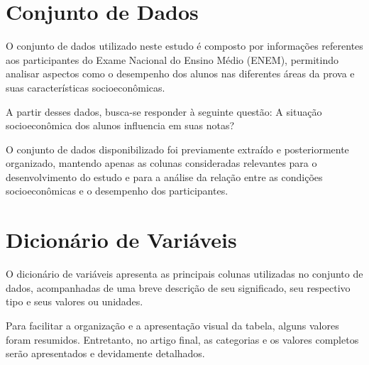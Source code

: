 \documentclass{article}
\begin{document}
\section{Conjunto de Dados}

O conjunto de dados utilizado neste estudo é composto por informações referentes aos participantes do Exame Nacional do Ensino Médio (ENEM), permitindo analisar aspectos como o desempenho dos alunos nas diferentes áreas da prova e suas características socioeconômicas.

A partir desses dados, busca-se responder à seguinte questão: A situação socioeconômica dos alunos influencia em suas notas?

O conjunto de dados disponibilizado foi previamente extraído e posteriormente organizado, mantendo apenas as colunas consideradas relevantes para o desenvolvimento do estudo e para a análise da relação entre as condições socioeconômicas e o desempenho dos participantes.

\section{Dicionário de Variáveis}

O dicionário de variáveis apresenta as principais colunas utilizadas no conjunto de dados, acompanhadas de uma breve descrição de seu significado, seu respectivo tipo e seus valores ou unidades.

Para facilitar a organização e a apresentação visual da tabela, alguns valores foram resumidos. Entretanto, no artigo final, as categorias e os valores completos serão apresentados e devidamente detalhados.
\end{document}

